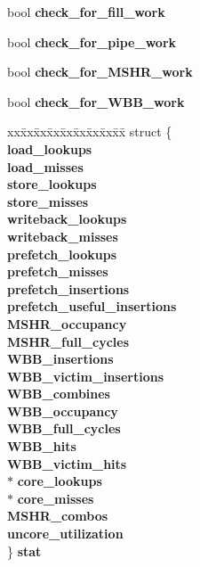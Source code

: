 \begin{CompactItemize}
\item 
bool {\bf check\_\-for\_\-fill\_\-work}
\item 
bool {\bf check\_\-for\_\-pipe\_\-work}
\item 
bool {\bf check\_\-for\_\-MSHR\_\-work}
\item 
bool {\bf check\_\-for\_\-WBB\_\-work}
\item 
\begin{tabbing}
xx\=xx\=xx\=xx\=xx\=xx\=xx\=xx\=xx\=\kill
struct \{\\
 {\bf load\_lookups}\\
 {\bf load\_misses}\\
 {\bf store\_lookups}\\
 {\bf store\_misses}\\
 {\bf writeback\_lookups}\\
 {\bf writeback\_misses}\\
 {\bf prefetch\_lookups}\\
 {\bf prefetch\_misses}\\
 {\bf prefetch\_insertions}\\
 {\bf prefetch\_useful\_insertions}\\
 {\bf MSHR\_occupancy}\\
 {\bf MSHR\_full\_cycles}\\
 {\bf WBB\_insertions}\\
 {\bf WBB\_victim\_insertions}\\
 {\bf WBB\_combines}\\
 {\bf WBB\_occupancy}\\
 {\bf WBB\_full\_cycles}\\
 {\bf WBB\_hits}\\
 {\bf WBB\_victim\_hits}\\
 $\ast$ {\bf core\_lookups}\\
 $\ast$ {\bf core\_misses}\\
 {\bf MSHR\_combos}\\
 {\bf uncore\_utilization}\\
\} {\bf stat}\\


\end{tabbing}
\end{CompactItemize}
